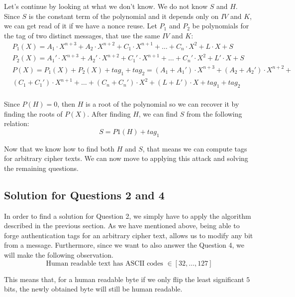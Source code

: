 \documentclass[11pt]{llncs}
\begin{document}
Let's continue by looking at what we don't know. We do not know $S$ and $H$. Since $S$ is the constant term of the polynomial and it depends only on $IV$ and $K$, we can get read of it if we have a nonce reuse. Let $P_1$ and $P_2$ be polynomials for the tag of two distinct messages, that use the same $IV$ and $K$:
\[ \begin{aligned}
& P_1(X) = A_1 \cdot X^{n+3} + A_2 \cdot X^{n+2} + C_1 \cdot X^{n+1} + \dots + C_n \cdot X^2 + L \cdot X + S\\
& P_2(X) = A_1' \cdot X^{n+3} + A_2' \cdot X^{n+2} + C_1' \cdot X^{n+1} + \dots + C_n' \cdot X^2 + L' \cdot X + S\\
& P(X) = P_1(X) + P_2(X) + tag_1 + tag_2 = (A_1 + A_1') \cdot X^{n+3} + (A_2 + A_2') \cdot X^{n+2} + \\ & (C_1 + C_1') \cdot X^{n+1} + \dots + (C_n + C_n') \cdot X^2 + (L + L') \cdot X + tag_1 + tag_2\\
\end{aligned}
\]

Since $P(H) = 0$, then $H$ is a root of the polynomial so we can recover it by finding the roots of $P(X)$. After finding $H$, we can find $S$ from the following relation:
\[S = P1(H) + tag_1\]

Now that we know how to find both $H$ and $S$, that means we can compute tags for arbitrary cipher texts. We can now move to applying this attack and solving the remaining questions.

\newpage
\subsection{Solution for Questions 2 and 4}

In order to find a solution for Question 2, we simply have to apply the algorithm described in the previous section. As we have mentioned above, being able to forge authentication tags for an arbitrary cipher text, allows us to modify any bit from a message. Furthermore, since we want to also answer the Question 4, we will make the following observation.
\[ \text{Human readable text has ASCII codes } \in [32,\dots,127]\]

This means that, for a human readable byte if we only flip the least significant $5$ bits, the newly obtained byte will still be human readable.
\end{document}
